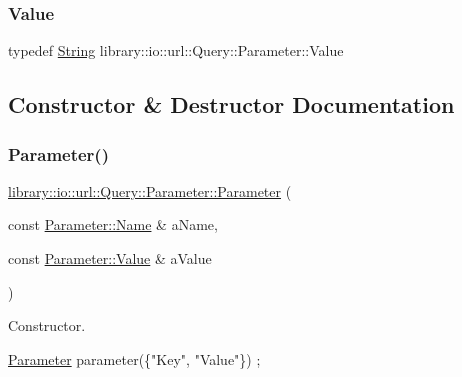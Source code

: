 \mbox{\label{classlibrary_1_1io_1_1url_1_1_query_1_1_parameter_a46e7a7b97d44f51f83d6261f70ba0a5e}} 
\subsubsection{\texorpdfstring{Value}{Value}}
{\footnotesize\ttfamily typedef \hyperlink{namespacelibrary_1_1io_a7469b45835a4421045db344d6a5a1f85}{String} library\+::io\+::url\+::\+Query\+::\+Parameter\+::\+Value}



\subsection{Constructor \& Destructor Documentation}
\mbox{\label{classlibrary_1_1io_1_1url_1_1_query_1_1_parameter_ad6160646a07cb92213403426dbba4c64}} 
\subsubsection{\texorpdfstring{Parameter()}{Parameter()}}
{\footnotesize\ttfamily \hyperlink{classlibrary_1_1io_1_1url_1_1_query_1_1_parameter}{library\+::io\+::url\+::\+Query\+::\+Parameter\+::\+Parameter} (\begin{DoxyParamCaption}\item[{const \hyperlink{classlibrary_1_1io_1_1url_1_1_query_1_1_parameter_a7edf5fb8a4ae57aed1ce5dfa2405c981}{Parameter\+::\+Name} \&}]{a\+Name,  }\item[{const \hyperlink{classlibrary_1_1io_1_1url_1_1_query_1_1_parameter_a46e7a7b97d44f51f83d6261f70ba0a5e}{Parameter\+::\+Value} \&}]{a\+Value }\end{DoxyParamCaption})}



Constructor. 


\begin{DoxyCode}
\hyperlink{classlibrary_1_1io_1_1url_1_1_query_1_1_parameter_ad6160646a07cb92213403426dbba4c64}{Parameter} parameter(\{\textcolor{stringliteral}{"Key"}, \textcolor{stringliteral}{"Value"}\}) ;
\end{DoxyCode}



